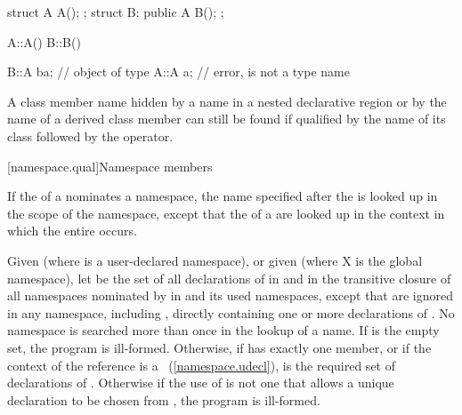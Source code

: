 \begin{codeblock}
struct A { A(); };
struct B: public A { B(); };

A::A() { }
B::B() { }

B::A ba;			// object of type 
A::A a;				// error,  is not a type name
\end{codeblock}
\exitexampleb

\pnum
A class member name hidden by a name in a nested declarative region or
by the name of a derived class member can still be found if qualified by
the name of its class followed by the \tcode{::} operator.

[namespace.qual]{Namespace members}

\pnum
{}%
If the  of a 
nominates a namespace, the name specified after the
 is looked up in the scope of the
namespace, except that the  of a
 are looked up in the context in which the
entire  occurs.

\pnum
Given  (where  is a user-declared namespace), or given
 (where X is the global namespace), let  be the set of all
declarations of  in  and in the transitive closure of all
namespaces nominated by  in  and
its used namespaces, except that  are
ignored in any namespace, including , directly containing one or
more declarations of
. No namespace is searched more than once in the lookup of a name.
If  is the empty set, the program is ill-formed. Otherwise, if
 has exactly one member, or if the context of the reference is
a ~(\ref{namespace.udecl}),  is the
required set of declarations of . Otherwise if the use of
 is not one that allows a unique declaration to be chosen from
, the program is ill-formed. \enterexample

